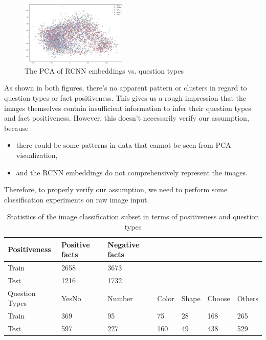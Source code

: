 \documentclass[nohyperref]{article}
\theoremstyle{plain}
\theoremstyle{definition}
\theoremstyle{remark}
\begin{document}
    \begin{figure}[h]
        \center
        \includegraphics[width=0.45\textwidth]{img/rcnn_embed_vs_qcate.jpg}
        \caption{The PCA of RCNN embeddings vs. question types}
        \label{fig:rcnn_embed_vs_qcate}
    \end{figure}

    As shown in both figures, there's no apparent pattern or clusters in regard to question types or fact positiveness.
    This gives us a rough impression that the images themselves contain insufficient information to infer their question
    types and fact positiveness.
    However, this doesn't necessarily verify our assumption, because
    \begin{itemize}
        \item there could be some patterns in data that cannot be seen from PCA visualization,
        \item and the RCNN embeddings do not comprehensively represent the images.
    \end{itemize}

    Therefore, to properly verify our assumption, we need to perform some classification experiments on raw image input.

    \begin{table}[h]
        \centering
        \footnotesize
        \begin{tabular}{lllllll}
            Positiveness   & Positive facts & Negative facts &       &       &        &        \\
            \toprule
            Train          & 2658           & 3673           &       &       &        &        \\
            \midrule
            Test           & 1216           & 1732           &       &       &        &        \\
            \bottomrule
            Question Types & YesNo          & Number         & Color & Shape & Choose & Others \\
            \toprule
            Train          & 369            & 95             & 75    & 28    & 168    & 265    \\
            \midrule
            Test           & 597            & 227            & 160   & 49    & 438    & 529    \\
            \bottomrule
        \end{tabular}
        \caption{Statistics of the image classification subset in terms of positiveness and question types}
        \label{tab:image_classification_subset}
        \vspace{-5pt}
    \end{table}
\end{document}
